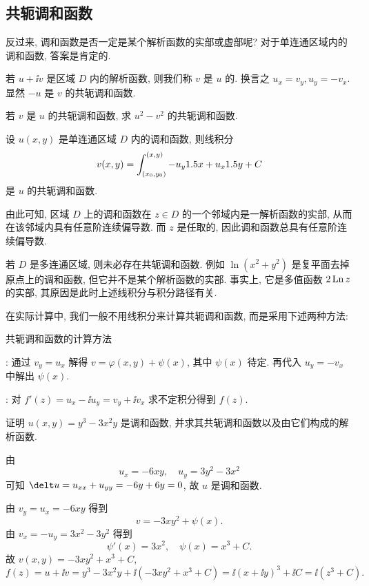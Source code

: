 \subsection{共轭调和函数}

反过来, 调和函数是否一定是某个解析函数的实部或虚部呢?
对于单连通区域内的调和函数, 答案是肯定的.

若 $u+\ii v$ 是区域 $D$ 内的解析函数, 则我们称 $v$ 是 $u$ 的.
换言之 $u_x=v_y,u_y=-v_x$.
显然 $-u$ 是 $v$ 的共轭调和函数.

\begin{exercise}
  若 $v$ 是 $u$ 的共轭调和函数, 求 $u^2-v^2$ 的共轭调和函数.
\end{exercise}

\begin{theorem}
  设 $u(x,y)$ 是单连通区域 $D$ 内的调和函数, 则线积分
  \[
    v(x,y)=\int_{(x_0,y_0)}^{(x,y)}-u_y1.5 x+u_x1.5 y+C
  \]
  是 $u$ 的共轭调和函数.
\end{theorem}

由此可知, 区域 $D$ 上的调和函数在 $z\in D$ 的一个邻域内是一解析函数的实部, 从而在该邻域内具有任意阶连续偏导数.
而 $z$ 是任取的, 因此\alert{调和函数总具有任意阶连续偏导数}.

若 $D$ 是多连通区域, 则未必存在共轭调和函数.
例如 $\ln(x^2+y^2)$ 是复平面去掉原点上的调和函数, 但它并不是某个解析函数的实部.
事实上, 它是多值函数 $2\operatorname{Ln} z$ 的实部, 其原因是此时上述线积分与积分路径有关.

在实际计算中, 我们一般不用线积分来计算共轭调和函数, 而是采用下述两种方法:
\begin{fifth}{共轭调和函数的计算方法}
  \begin{enuma}
    \item {}: 通过 $v_y=u_x$ 解得 $v=\varphi(x,y)+\psi(x)$, 其中 $\psi(x)$ 待定. 再代入 $u_y=-v_x$ 中解出 $\psi(x)$.
    \item {}: 对 $f'(z)=u_x-\ii u_y=v_y+\ii v_x$ 求不定积分得到 $f(z)$.
  \end{enuma}
\end{fifth}

\begin{example}
  证明 $u(x,y)=y^3-3x^2y$ 是调和函数, 并求其共轭调和函数以及由它们构成的解析函数.
\end{example}

\begin{solution}
  由
  \[
    u_x=-6xy,\quad u_y=3y^2-3x^2
  \]
  可知 $\delt u=u_{xx}+u_{yy}=-6y+6y=0$, 故 $u$ 是调和函数.

  由 $v_y=u_x=-6xy$ 得到
  \[
    v=-3xy^2+\psi(x).
  \]
  由 $v_x=-u_y=3x^2-3y^2$ 得到
  \[
    \psi'(x)=3x^2,\quad \psi(x)=x^3+C.
  \]
  故 $v(x,y)=-3xy^2+x^3+C$,
  \[
     f(z)
    =u+\ii v
    =y^3-3x^2y+\ii(-3xy^2+x^3+C)
    =\ii (x+\ii y)^3+\ii C
    =\ii (z^3+C).
  \]
\end{solution}

